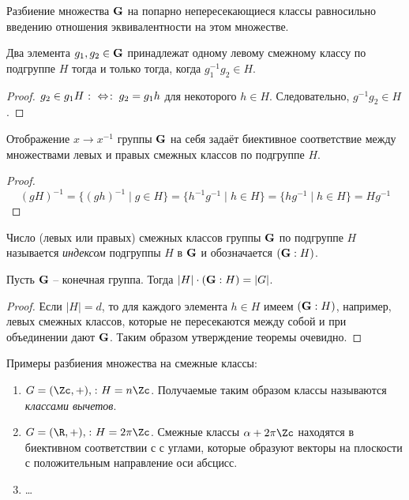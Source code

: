 Разбиение множества $\mathbf{G}$ на попарно непересекающиеся классы равносильно введению отношения эквивалентности на этом множестве.

\begin{theorem}
  Два элемента $g_1,g_2\in\mathbf{G}$ принадлежат одному левому смежному классу по подгруппе $H$ тогда и только тогда, когда $g_1^{-1}g_2\in H$.
\end{theorem}
\begin{proof}
  $g_2\in g_1H \mathbin{\colon\Leftrightarrow\colon} g_2=g_1h$ для некоторого $h\in H$. Следовательно, $g^{-1}g_2\in H$.
\end{proof}

\begin{theorem}
  Отображение $x\to x^{-1}$ группы $\mathbf{G}$ на себя задаёт биективное соответствие между множествами левых и правых смежных классов по подгруппе $H$.
\end{theorem}
\begin{proof}
  $$(gH)^{-1}=\{(gh)^{-1}\mid g\in H\} = \{h^{-1}g^{-1}\mid h\in H\}=\{hg^{-1}\mid h\in H\}=Hg^{-1}$$
\end{proof}

\begin{df}
  Число (левых или правых) смежных классов группы $\mathbf{G}$ по подгруппе $H$ называется \emph{индексом} подгруппы $H$ в $\mathbf{G}$ и обозначается $(\mathbf{G}:H)$.
\end{df}

\begin{theorem}[Лагранжа]
  Пусть $\mathbf{G}$ -- конечная группа. Тогда $|H|\cdot (\mathbf{G}:H)=|G|$.
\end{theorem}
\begin{proof}
  Если $|H|=d$, то для каждого элемента $h\in H$ имеем $(\mathbf{G}:H)$, например, левых смежных классов, которые не пересекаются между собой и при объединении дают $\mathbf{G}$. Таким образом утверждение теоремы очевидно.
\end{proof}

Примеры разбиения множества на смежные классы:
\begin{enumerate}
  \item $G=(\Zc,+),\spc H=n\Zc$. Получаемые таким образом классы называются \emph{классами вычетов}.
  \item $G=(\R,+),\spc H=2\pi\Zc$. Смежные классы $\al+2\pi\Zc$ находятся в биективном соответствии с с углами, которые образуют векторы на плоскости с положительным направление оси абсцисс.
  \item \dots
\end{enumerate}
